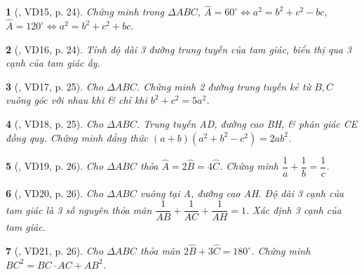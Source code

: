 \documentclass{article}
\newtheorem{baitoan}{}
\begin{document}
\begin{baitoan}[\cite{Kien_hinh_hoc_9}, VD15, p. 24]
	Chứng minh trong $\Delta ABC$, $\widehat{A} = 60^\circ\Leftrightarrow a^2 = b^2 + c^2 - bc$, $\widehat{A} = 120^\circ\Leftrightarrow a^2 = b^2 + c^2 + bc$.
\end{baitoan}

\begin{baitoan}[\cite{Kien_hinh_hoc_9}, VD16, p. 24]
	Tính độ dài 3 đường trung tuyến của tam giác, biểu thị qua 3 cạnh của tam giác ấy.
\end{baitoan}

\begin{baitoan}[\cite{Kien_hinh_hoc_9}, VD17, p. 25]
	Cho $\Delta ABC$. Chứng minh 2 đường trung tuyến kẻ từ $B,C$ vuông góc với nhau khi \& chỉ khi $b^2 + c^2 = 5a^2$.	
\end{baitoan}

\begin{baitoan}[\cite{Kien_hinh_hoc_9}, VD18, p. 25]
	Cho $\Delta ABC$. Trung tuyến AD, đường cao BH, \& phân giác CE đồng quy. Chứng minh đẳng thức $(a + b)(a^2 + b^2 - c^2) = 2ab^2$.
\end{baitoan}

\begin{baitoan}[\cite{Kien_hinh_hoc_9}, VD19, p. 26]
	Cho $\Delta ABC$ thỏa $\widehat{A} = 2\widehat{B} = 4\widehat{C}$. Chứng minh $\dfrac{1}{a} + \dfrac{1}{b} = \dfrac{1}{c}$.
\end{baitoan}

\begin{baitoan}[\cite{Kien_hinh_hoc_9}, VD20, p. 26]
	Cho $\Delta ABC$ vuông tại A, đường cao AH. Độ dài 3 cạnh của tam giác là 3 số nguyên thỏa mãn $\dfrac{1}{AB} + \dfrac{1}{AC} + \dfrac{1}{AH} = 1$. Xác định 3 cạnh của tam giác.
\end{baitoan}

\begin{baitoan}[\cite{Kien_hinh_hoc_9}, VD21, p. 26]
	Cho $\Delta ABC$ thỏa mãn $2\widehat{B} + 3\widehat{C} = 180^\circ$. Chứng minh $BC^2 = BC\cdot AC + AB^2$.
\end{baitoan}


\printbibliography[heading=bibintoc]
\end{document}
